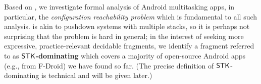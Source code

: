 %

Based on {\AMASS}, we %
investigate formal analysis of Android multitasking apps, %
in particular, the \emph{configuration reachability problem} which is fundamental to all such analysis. {\AMASS} is akin to pushdown systems with multiple stacks, so it is perhaps not surprising that the problem is hard in general; 
in the interest of seeking more expressive, practice-relevant decidable fragments,
we identify a fragment referred to as \textbf{$\mathsf{STK}$-dominating {\AMASS}} 
which 
covers a majority of open-source Android apps (e.g., from F-Droid) we have found so far. (The precise definition of $\mathsf{STK}$-dominating {\AMASS} is technical and will be given later.) 

